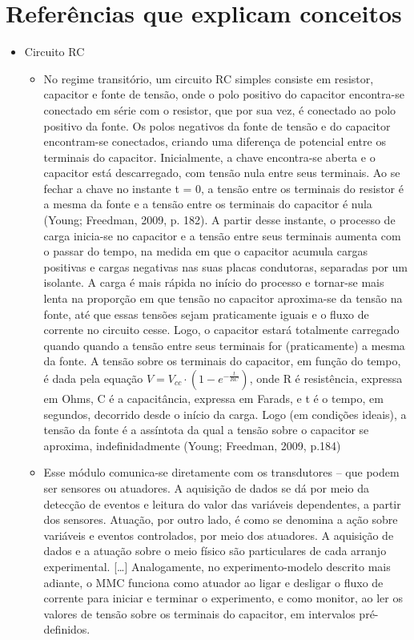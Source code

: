 \documentclass{article}
\begin{document}
\section{Referências que explicam conceitos}
\begin{itemize}
	\item Circuito RC
	\begin{itemize}
		\item No regime transitório, um circuito RC simples consiste em resistor, capacitor e fonte de tensão, onde o polo positivo do capacitor encontra-se conectado em série com o resistor, que por sua vez, é conectado ao polo positivo da fonte. Os polos negativos da fonte de tensão e do capacitor encontram-se conectados, criando uma diferença de potencial entre os terminais do capacitor. Inicialmente, a chave encontra-se aberta e o capacitor está descarregado, com tensão nula entre seus terminais. Ao se fechar a chave no instante t = 0, a tensão entre os terminais do resistor é a mesma da fonte e a tensão entre os terminais do capacitor é nula (Young; Freedman, 2009, p. 182). A partir desse instante, o processo de carga inicia-se no capacitor e a tensão entre seus terminais aumenta com o passar do tempo, na medida em que o capacitor acumula cargas positivas e cargas negativas nas suas placas condutoras, separadas por um isolante. A carga é mais rápida no início do processo e tornar-se mais lenta na proporção em que tensão no capacitor aproxima-se da tensão na fonte, até que essas tensões sejam praticamente iguais e o fluxo de corrente no circuito cesse. Logo, o capacitor estará totalmente carregado quando quando a tensão entre seus terminais for (praticamente) a mesma da fonte. A tensão sobre os terminais do capacitor, em função do tempo, é dada pela equação $V = V_{cc} \cdot (1 - e^{-\frac{t}{RC}})$, onde R é resistência, expressa em Ohms, C é a capacitância, expressa em Farads, e t é o tempo, em segundos, decorrido desde o início da carga. Logo (em condições ideais), a tensão da fonte é a assíntota da qual a tensão sobre o capacitor se aproxima, indefinidadmente (Young; Freedman, 2009, p.184) \cite{rogerio}
		\item Esse módulo comunica-se diretamente com os transdutores – que podem ser sensores ou atuadores. A aquisição de dados se dá por meio da detecção de eventos e leitura do valor das variáveis dependentes, a partir dos sensores. Atuação, por outro lado, é como se denomina a ação sobre variáveis e eventos controlados, por meio dos atuadores. A aquisição de dados e a atuação sobre o meio físico são particulares de cada arranjo experimental. [\dots] Analogamente, no experimento-modelo descrito mais adiante, o MMC funciona como atuador ao ligar e desligar o fluxo de corrente para iniciar e terminar o experimento, e como monitor, ao ler os valores de tensão sobre os terminais do capacitor, em intervalos pré-definidos. \cite{rogerio}

\end{itemize}
\end{itemize}
\end{document}
